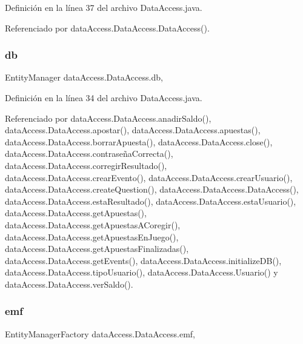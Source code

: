 Definición en la línea 37 del archivo Data\+Access.\+java.



Referenciado por data\+Access.\+Data\+Access.\+Data\+Access().

\mbox{\label{classdataAccess_1_1DataAccess_a0920d5a9c61bdae39ef950d6e4e187e4}} 
\subsubsection{\texorpdfstring{db}{db}}
{\footnotesize\ttfamily Entity\+Manager data\+Access.\+Data\+Access.\+db\hspace{0.3cm}{\ttfamily [static]}, {\ttfamily [protected]}}



Definición en la línea 34 del archivo Data\+Access.\+java.



Referenciado por data\+Access.\+Data\+Access.\+anadir\+Saldo(), data\+Access.\+Data\+Access.\+apostar(), data\+Access.\+Data\+Access.\+apuestas(), data\+Access.\+Data\+Access.\+borrar\+Apuesta(), data\+Access.\+Data\+Access.\+close(), data\+Access.\+Data\+Access.\+contraseña\+Correcta(), data\+Access.\+Data\+Access.\+corregir\+Resultado(), data\+Access.\+Data\+Access.\+crear\+Evento(), data\+Access.\+Data\+Access.\+crear\+Usuario(), data\+Access.\+Data\+Access.\+create\+Question(), data\+Access.\+Data\+Access.\+Data\+Access(), data\+Access.\+Data\+Access.\+esta\+Resultado(), data\+Access.\+Data\+Access.\+esta\+Usuario(), data\+Access.\+Data\+Access.\+get\+Apuestas(), data\+Access.\+Data\+Access.\+get\+Apuestas\+A\+Coregir(), data\+Access.\+Data\+Access.\+get\+Apuestas\+En\+Juego(), data\+Access.\+Data\+Access.\+get\+Apuestas\+Finalizadas(), data\+Access.\+Data\+Access.\+get\+Events(), data\+Access.\+Data\+Access.\+initialize\+D\+B(), data\+Access.\+Data\+Access.\+tipo\+Usuario(), data\+Access.\+Data\+Access.\+Usuario() y data\+Access.\+Data\+Access.\+ver\+Saldo().

\mbox{\label{classdataAccess_1_1DataAccess_a158d2718ef5a80f4f296b14937cc1775}} 
\subsubsection{\texorpdfstring{emf}{emf}}
{\footnotesize\ttfamily Entity\+Manager\+Factory data\+Access.\+Data\+Access.\+emf\hspace{0.3cm}{\ttfamily [static]}, {\ttfamily [protected]}}



